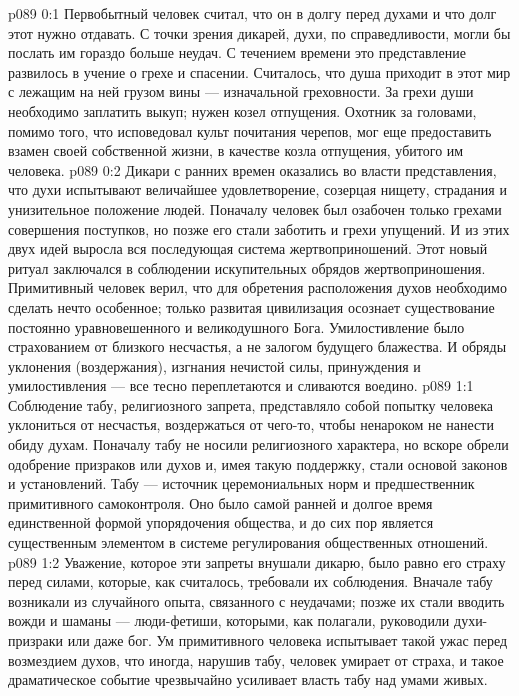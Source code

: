 \author{Блестящая Вечерняя Звезда}
\vs p089 0:1 Первобытный человек считал, что он в долгу перед духами и что долг этот нужно отдавать. С точки зрения дикарей, духи, по справедливости, могли бы послать им гораздо больше неудач. С течением времени это представление развилось в учение о грехе и спасении. Считалось, что душа приходит в этот мир с лежащим на ней грузом вины --- изначальной греховности. За грехи души необходимо заплатить выкуп; нужен козел отпущения. Охотник за головами, помимо того, что исповедовал культ почитания черепов, мог еще предоставить взамен своей собственной жизни, в качестве козла отпущения, убитого им человека.
\vs p089 0:2 Дикари с ранних времен оказались во власти представления, что духи испытывают величайшее удовлетворение, созерцая нищету, страдания и унизительное положение людей. Поначалу человек был озабочен только грехами совершения поступков, но позже его стали заботить и грехи упущений. И из этих двух идей выросла вся последующая система жертвоприношений. Этот новый ритуал заключался в соблюдении искупительных обрядов жертвоприношения. Примитивный человек верил, что для обретения расположения духов необходимо сделать нечто особенное; только развитая цивилизация осознает существование постоянно уравновешенного и великодушного Бога. Умилостивление было страхованием от близкого несчастья, а не залогом будущего блажества. И обряды уклонения (воздержания), изгнания нечистой силы, принуждения и умилостивления --- все тесно переплетаются и сливаются воедино.
\vs p089 1:1 Соблюдение табу, религиозного запрета, представляло собой попытку человека уклониться от несчастья, воздержаться от чего\hyp{}то, чтобы ненароком не нанести обиду духам. Поначалу табу не носили религиозного характера, но вскоре обрели одобрение призраков или духов и, имея такую поддержку, стали основой законов и установлений. Табу --- источник церемониальных норм и предшественник примитивного самоконтроля. Оно было самой ранней и долгое время единственной формой упорядочения общества, и до сих пор является существенным элементом в системе регулирования общественных отношений.
\vs p089 1:2 Уважение, которое эти запреты внушали дикарю, было равно его страху перед силами, которые, как считалось, требовали их соблюдения. Вначале табу возникали из случайного опыта, связанного с неудачами; позже их стали вводить вожди и шаманы --- люди\hyp{}фетиши, которыми, как полагали, руководили духи\hyp{}призраки или даже бог. Ум примитивного человека испытывает такой ужас перед возмездием духов, что иногда, нарушив табу, человек умирает от страха, и такое драматическое событие чрезвычайно усиливает власть табу над умами живых.
